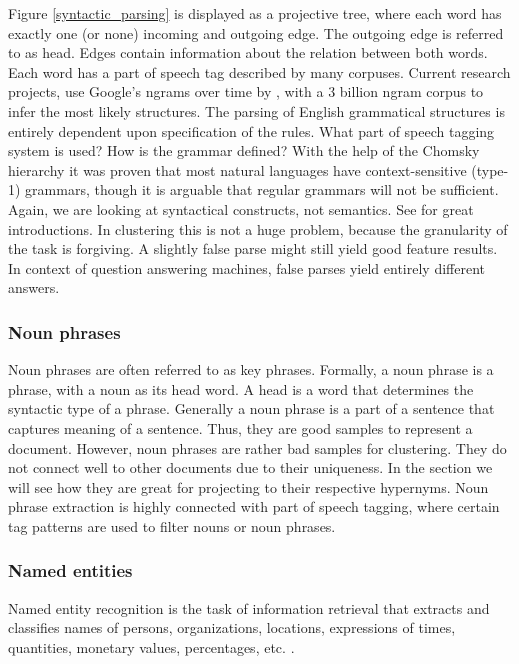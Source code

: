   Figure \ref{syntactic_parsing} is displayed as a projective tree, where each word has exactly one (or none) incoming and outgoing edge. The outgoing edge is referred to as head. Edges contain information about the relation between both words. Each word has a part of speech tag described by many corpuses. Current research projects, use Google's ngrams over time by \cite{SyntacticNgramsOverTime2013}, with a 3 billion ngram corpus to infer the most likely structures.
  The parsing of English grammatical structures is entirely dependent upon specification of the rules. What part of speech tagging system is used? How is the grammar defined? With the help of the Chomsky hierarchy it was proven that most natural languages have context-sensitive (type-1) grammars, though it is arguable that regular grammars will not be sufficient. Again, we are looking at syntactical constructs, not semantics. See \cite[chp. 16]{NLPBookJurafsky2000, FormalLanguageTheory2012} for great introductions.
  In clustering this is not a huge problem, because the granularity of the task is forgiving. A slightly false parse might still yield good feature results. In context of question answering machines, false parses yield entirely different answers.

  \subsubsection*{Noun phrases}
  Noun phrases are often referred to as key phrases. Formally, a noun phrase is a phrase, with a noun as its head word. A head is a word that determines the syntactic type of a phrase. Generally a noun phrase is a part of a sentence that captures meaning of a sentence. Thus, they are good samples to represent a document. However, noun phrases are rather bad samples for clustering. They do not connect well to other documents due to their uniqueness. In the \wordnet{} section we will see how they are great for projecting to their respective hypernyms. Noun phrase extraction is highly connected with part of speech tagging, where certain tag patterns are used to filter nouns or noun phrases. \cite[chp. 5, 12]{NLPBookJurafsky2000}

  \subsubsection*{Named entities}
  Named entity recognition is the task of information retrieval that extracts and classifies  names of persons, organizations, locations, expressions of times, quantities, monetary values, percentages, etc. \cite[chp. 22]{NLPBookJurafsky2000}. 

